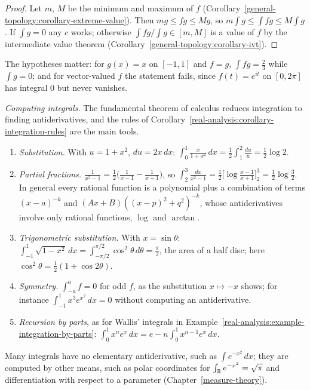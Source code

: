 \begin{proof}
Let $m$, $M$ be the minimum and maximum of $f$ (Corollary~\ref{general-topology:corollary-extreme-value}). Then $mg \leq fg \leq Mg$, so $m\int g \leq \int fg \leq M\int g$. If $\int g = 0$ any $c$ works;
otherwise $\int fg/\int g \in [m, M]$ is a value of $f$ by the intermediate value theorem (Corollary~\ref{general-topology:corollary-ivt}).
\end{proof}

The hypotheses matter: for $g(x) = x$ on $[-1, 1]$ and $f = g$, $\int fg = \frac23$ while $\int g = 0$; and for vector-valued $f$ the statement fails, since $f(t) = e^{it}$ on $[0, 2\pi]$ has integral $0$
but never vanishes.

\begin{example}\label{real-analysis:example-computing-integrals}
\emph{Computing integrals.} The fundamental theorem of calculus reduces integration to finding antiderivatives, and the rules of Corollary~\ref{real-analysis:corollary-integration-rules} are the
main tools.
\begin{enumerate}
\item \emph{Substitution.} With $u = 1 + x^2$, $du = 2x\,dx$: $\int_0^1\frac{x}{1 + x^2}\,dx = \frac12\int_1^2\frac{du}{u} = \frac12\log 2$.
\item \emph{Partial fractions.} $\frac{1}{x^2 - 1} = \frac12\bigl(\frac{1}{x - 1} - \frac{1}{x + 1}\bigr)$, so $\int_2^3\frac{dx}{x^2 - 1} = \frac12\bigl[\log\frac{x - 1}{x + 1}\bigr]_2^3 = \frac12\log\frac32$.
In general every rational function is a polynomial plus a combination of terms $(x - a)^{-k}$ and $(Ax + B)((x - p)^2 + q^2)^{-k}$, whose antiderivatives involve only rational functions,
$\log$ and $\arctan$.
\item \emph{Trigonometric substitution.} With $x = \sin\theta$: $\int_{-1}^1\sqrt{1 - x^2}\,dx = \int_{-\pi/2}^{\pi/2}\cos^2\theta\,d\theta = \frac\pi2$, the area of a half disc; here
$\cos^2\theta = \frac12(1 + \cos 2\theta)$.
\item \emph{Symmetry.} $\int_{-a}^af = 0$ for odd $f$, as the substitution $x \mapsto -x$ shows; for instance $\int_{-1}^1x^3e^{x^2}\,dx = 0$ without computing an antiderivative.
\item \emph{Recursion by parts}, as for Wallis' integrals in Example~\ref{real-analysis:example-integration-by-parts}: $\int_0^1x^ne^x\,dx = e - n\int_0^1x^{n-1}e^x\,dx$.
\end{enumerate}
Many integrals have no elementary antiderivative, such as $\int e^{-x^2}\,dx$; they are computed by other means, such as polar coordinates for $\int_{\mathbb{R}} e^{-x^2} = \sqrt\pi$ and differentiation with
respect to a parameter (Chapter~\ref{measure-theory}).
\end{example}

